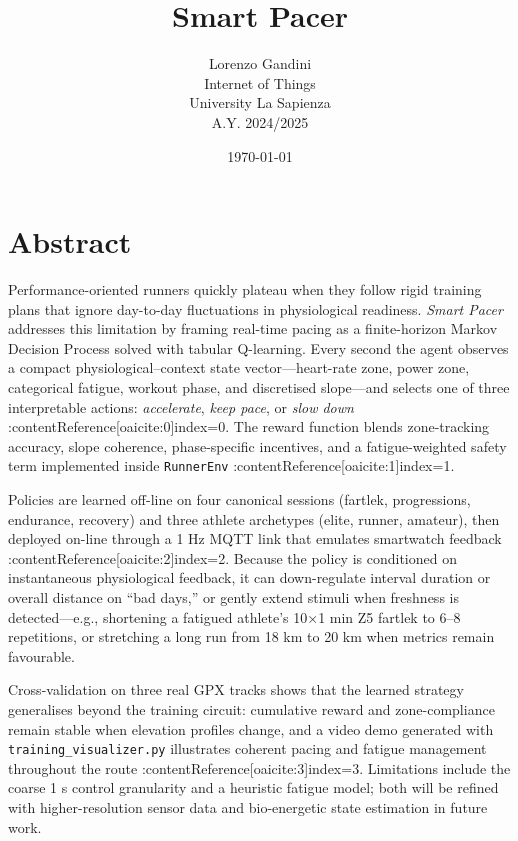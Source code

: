 \documentclass[a4paper,12pt]{article}
\title{Smart Pacer}
\author{Lorenzo Gandini \\ Internet of Things \\ University La Sapienza \\ A.Y. 2024/2025}
\date{\today}
\begin{document}
\maketitle

\newpage

\tableofcontents
\newpage

\section{Abstract}\label{abstract}
Performance­-oriented runners quickly plateau when they follow rigid training plans that ignore day-to-day fluctuations in physiological readiness.  \emph{Smart Pacer} addresses this limitation by framing real-time pacing as a finite-horizon Markov Decision Process solved with tabular Q-learning.  Every second the agent observes a compact physiological–context state vector—heart-rate zone, power zone, categorical fatigue, workout phase, and discretised slope—and selects one of three interpretable actions: \emph{accelerate}, \emph{keep pace}, or \emph{slow down} :contentReference[oaicite:0]{index=0}.  The reward function blends zone-tracking accuracy, slope coherence, phase-specific incentives, and a fatigue-weighted safety term implemented inside \texttt{RunnerEnv} :contentReference[oaicite:1]{index=1}.

Policies are learned off-line on four canonical sessions (fartlek, progressions, endurance, recovery) and three athlete archetypes (elite, runner, amateur), then deployed on-line through a 1 Hz MQTT link that emulates smartwatch feedback :contentReference[oaicite:2]{index=2}.  Because the policy is conditioned on instantaneous physiological feedback, it can down-regulate interval duration or overall distance on “bad days,” or gently extend stimuli when freshness is detected—e.g., shortening a fatigued athlete’s 10×1 min Z5 fartlek to 6–8 repetitions, or stretching a long run from 18 km to 20 km when metrics remain favourable.

Cross-validation on three real GPX tracks shows that the learned strategy generalises beyond the training circuit: cumulative reward and zone-compliance remain stable when elevation profiles change, and a video demo generated with \texttt{training\_visualizer.py} illustrates coherent pacing and fatigue management throughout the route :contentReference[oaicite:3]{index=3}.  Limitations include the coarse 1 s control granularity and a heuristic fatigue model; both will be refined with higher-resolution sensor data and bio-energetic state estimation in future work.
\end{document}
